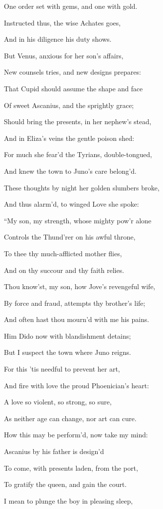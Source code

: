 One order set with gems, and one with gold.

Instructed thus, the wise Achates goes,

And in his diligence his duty shows.

But Venus, anxious for her son’s affairs,

New counsels tries, and new designs prepares:

That Cupid should assume the shape and face

Of sweet Ascanius, and the sprightly grace;

Should bring the presents, in her nephew’s stead,

And in Eliza’s veins the gentle poison shed:

For much she fear’d the Tyrians, double-tongued,

And knew the town to Juno’s care belong’d.

These thoughts by night her golden slumbers broke,

And thus alarm’d, to winged Love she spoke:

“My son, my strength, whose mighty pow’r alone

Controls the Thund’rer on his awful throne,

To thee thy much-afflicted mother flies,

And on thy succour and thy faith relies.

Thou know’st, my son, how Jove’s revengeful wife,

By force and fraud, attempts thy brother’s life;

And often hast thou mourn’d with me his pains.

Him Dido now with blandishment detains;

But I suspect the town where Juno reigns.

For this ’tis needful to prevent her art,

And fire with love the proud Phoenician’s heart:

A love so violent, so strong, so sure,

As neither age can change, nor art can cure.

How this may be perform’d, now take my mind:

Ascanius by his father is design’d

To come, with presents laden, from the port,

To gratify the queen, and gain the court.

I mean to plunge the boy in pleasing sleep,

